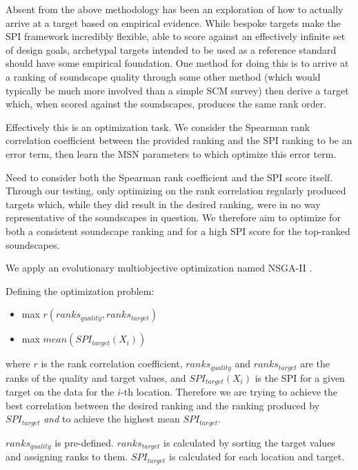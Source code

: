 \documentclass[
  authoryear,
  preprint,
  3p]{elsarticle}
\providecommand{\tightlist}{%
  \setlength{\itemsep}{0pt}\setlength{\parskip}{0pt}}\usepackage{longtable,booktabs,array}
\begin{document}
Absent from the above methodology has been an exploration of how to
actually arrive at a target based on empirical evidence. While bespoke
targets make the SPI framework incredibly flexible, able to score
against an effectively infinite set of design goals, archetypal targets
intended to be used as a reference standard should have some empirical
foundation. One method for doing this is to arrive at a ranking of
soundscape quality through some other method (which would typically be
much more involved than a simple SCM survey) then derive a target which,
when scored against the soundscapes, produces the same rank order.

Effectively this is an optimization task. We consider the Spearman rank
correlation coefficient between the provided ranking and the SPI ranking
to be an error term, then learn the MSN parameters to which optimize
this error term.

Need to consider both the Spearman rank coefficient and the SPI score
itself. Through our testing, only optimizing on the rank correlation
regularly produced targets which, while they did result in the desired
ranking, were in no way representative of the soundscapes in question.
We therefore aim to optimize for both a consistent soundscape ranking
and for a high SPI score for the top-ranked soundscapes.

We apply an evolutionary multiobjective optimization named NSGA-II
\citep{Deb2014Evolutionary}.

Defining the optimization problem:

\begin{itemize}
\tightlist
\item
  max \(r(ranks_{quality}, ranks_{target})\)
\item
  max \(mean(SPI_{target}(X_i))\)
\end{itemize}

where \(r\) is the rank correlation coefficient, \(ranks_{quality}\) and
\(ranks_{target}\) are the ranks of the quality and target values, and
\(SPI_{target}(X_i)\) is the SPI for a given target on the data for the
\(i\)-th location. Therefore we are trying to achieve the best
correlation between the desired ranking and the ranking produced by
\(SPI_{target}\) \emph{and} to achieve the highest mean
\(SPI_{target}\).

\(ranks_{quality}\) is pre-defined. \(ranks_{target}\) is calculated by
sorting the target values and assigning ranks to them. \(SPI_{target}\)
is calculated for each location and target.
\end{document}
